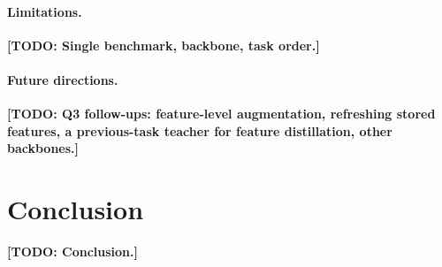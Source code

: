 \documentclass[10pt,twocolumn,letterpaper]{article}
\newcommand{\TODO}[1]{\textbf{\color{red}[TODO: #1]}}
\newcommand{\Q}[1]{\textbf{Q#1}\xspace}     %
\begin{document}
\paragraph{Limitations.}
\TODO{Single benchmark, backbone, task order.}

\paragraph{Future directions.}
\TODO{\Q{3} follow-ups: feature-level augmentation, refreshing stored features, a previous-task teacher for feature distillation, other backbones.}

\section{Conclusion}
\label{sec:conclusion}

\TODO{Conclusion.}

{
    \small
    
    
}
\end{document}
